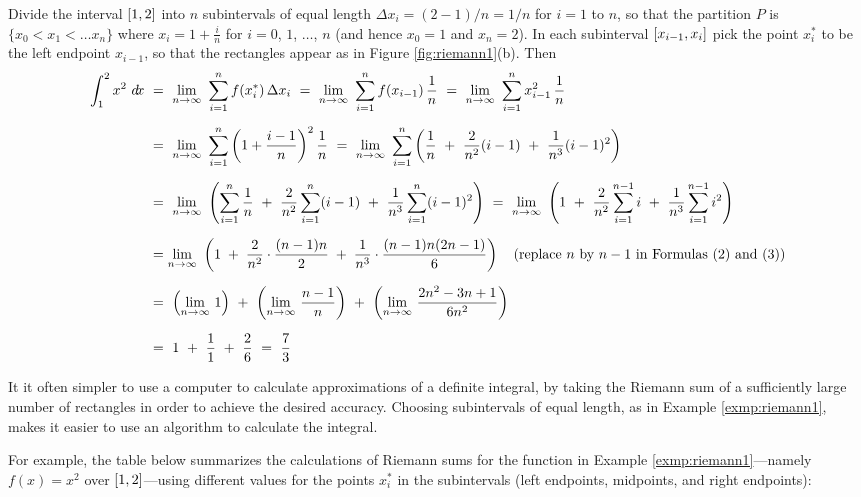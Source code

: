 \begin{exmp}
\noindent Divide the interval $\lbrack 1,2 \rbrack$ into $n$ subintervals of equal
length $\Delta x_i = (2-1)/n = 1/n$ for $i =1$ to $n$, so that the partition $P$ is
$\lbrace x_0 < x_1 < \ldots x_n \rbrace$ where $x_i = 1 + \frac{i}{n}$ for
$i=0$, $1$, $\ldots$, $n$ (and hence $x_0=1$ and $x_n=2$). In each subinterval
$\lbrack x_{i-1},x_i \rbrack$ pick the point $x_i^*$ to be the left endpoint $x_{i-1}$,
so that the rectangles appear as in Figure \ref{fig:riemann1}(b). Then
\begin{align*}
\int_1^2 x^2~d\!x ~&=~ \lim_{n \to \infty}~\sum_{i=1}^{n} f(x_i^*)\,\Delta x_i
~=~ \lim_{n \to \infty}~\sum_{i=1}^{n} f(x_{i-1})\,\frac{1}{n}
~=~ \lim_{n \to \infty}~\sum_{i=1}^{n} x_{i-1}^2\,\frac{1}{n}\\[6pt]
&=~ \lim_{n \to \infty}~\sum_{i=1}^{n} \left(1 + \frac{i-1}{n}\right)^2\frac{1}{n}
~=~ \lim_{n \to \infty}~\sum_{i=1}^{n} \left(\frac{1}{n} ~+~ \frac{2}{n^2}(i-1) ~+~
 \frac{1}{n^3}(i-1)^2\right)\\[6pt]
&=~ \lim_{n \to \infty}~\left(\sum_{i=1}^{n}\frac{1}{n} ~+~ \frac{2}{n^2}\sum_{i=1}^{n}(i-1) ~+~
    \frac{1}{n^3}\sum_{i=1}^{n}(i-1)^2\right)
~=~ \lim_{n \to \infty}~\left(1 ~+~ \frac{2}{n^2}\sum_{i=1}^{n-1}i ~+~
    \frac{1}{n^3}\sum_{i=1}^{n-1}i^2\right)\\[6pt]
&= \lim_{n \to \infty}~\left(1 \;+\; \frac{2}{n^2}\cdot\frac{(n-1)n}{2} \;+\;
   \frac{1}{n^3}\cdot\frac{(n-1)n(2n-1)}{6}\right)\quad\text{(replace $n$ by $n-1$ in Formulas (2) and (3))}\\[6pt]
&=~ \left(\lim_{n \to \infty}\,1\right) ~+~ \left(\lim_{n \to \infty}\,\frac{n-1}{n}\right)
    ~+~ \left(\lim_{n \to \infty}\,\frac{2n^2-3n+1}{6n^2}\right)\\[6pt]
&=~ 1 ~+~ \frac{1}{1} ~+~ \frac{2}{6} ~=~ \frac{7}{3}
\end{align*}
\end{exmp}
\divider
\newpage
It it often simpler to use a computer to calculate approximations of a definite
integral, by taking the Riemann sum of a sufficiently large number of
rectangles in order to achieve the desired accuracy. Choosing subintervals of
equal length, as in Example \ref{exmp:riemann1}, makes it easier to use an
algorithm to calculate the integral.

For example, the table below summarizes the calculations of Riemann sums for the
function in Example \ref{exmp:riemann1}---namely $f(x)= x^2$ over
$\lbrack 1,2 \rbrack$---using different values for the points $x_i^*$ in the
subintervals (left endpoints, midpoints, and right endpoints):

